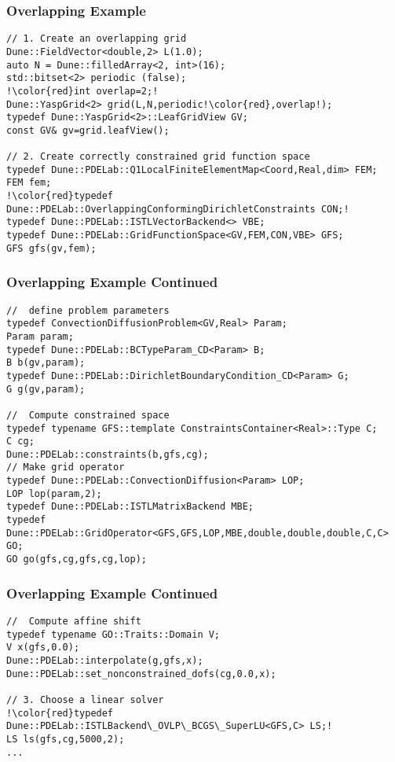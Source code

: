 \begin{frame}[fragile]
  \frametitle{Overlapping Example}
  \begin{lstlisting}[breaklines=true,escapechar=!]
// 1. Create an overlapping grid
Dune::FieldVector<double,2> L(1.0);
auto N = Dune::filledArray<2, int>(16);
std::bitset<2> periodic (false);
!\color{red}int overlap=2;!
Dune::YaspGrid<2> grid(L,N,periodic!\color{red},overlap!);
typedef Dune::YaspGrid<2>::LeafGridView GV;
const GV& gv=grid.leafView();

// 2. Create correctly constrained grid function space
typedef Dune::PDELab::Q1LocalFiniteElementMap<Coord,Real,dim> FEM;
FEM fem;
!\color{red}typedef Dune::PDELab::OverlappingConformingDirichletConstraints CON;!
typedef Dune::PDELab::ISTLVectorBackend<> VBE;
typedef Dune::PDELab::GridFunctionSpace<GV,FEM,CON,VBE> GFS;
GFS gfs(gv,fem);
\end{lstlisting}
\end{frame}
\begin{frame}[fragile]
\frametitle<presentation>{Overlapping Example Continued}
  \begin{lstlisting}[breaklines=true]
//  define problem parameters
typedef ConvectionDiffusionProblem<GV,Real> Param;
Param param;
typedef Dune::PDELab::BCTypeParam_CD<Param> B;
B b(gv,param);
typedef Dune::PDELab::DirichletBoundaryCondition_CD<Param> G;
G g(gv,param);

//  Compute constrained space
typedef typename GFS::template ConstraintsContainer<Real>::Type C;
C cg;
Dune::PDELab::constraints(b,gfs,cg);
// Make grid operator
typedef Dune::PDELab::ConvectionDiffusion<Param> LOP;
LOP lop(param,2);
typedef Dune::PDELab::ISTLMatrixBackend MBE;
typedef Dune::PDELab::GridOperator<GFS,GFS,LOP,MBE,double,double,double,C,C> GO;
GO go(gfs,cg,gfs,cg,lop);
\end{lstlisting}
\end{frame}
\begin{frame}[fragile]
\frametitle<presentation>{Overlapping Example Continued}
  \begin{lstlisting}[breaklines=true,escapechar=!]
//  Compute affine shift
typedef typename GO::Traits::Domain V;
V x(gfs,0.0);
Dune::PDELab::interpolate(g,gfs,x);
Dune::PDELab::set_nonconstrained_dofs(cg,0.0,x);

// 3. Choose a linear solver
!\color{red}typedef Dune::PDELab::ISTLBackend\_OVLP\_BCGS\_SuperLU<GFS,C> LS;!
LS ls(gfs,cg,5000,2);
...
\end{lstlisting}
\end{frame}

